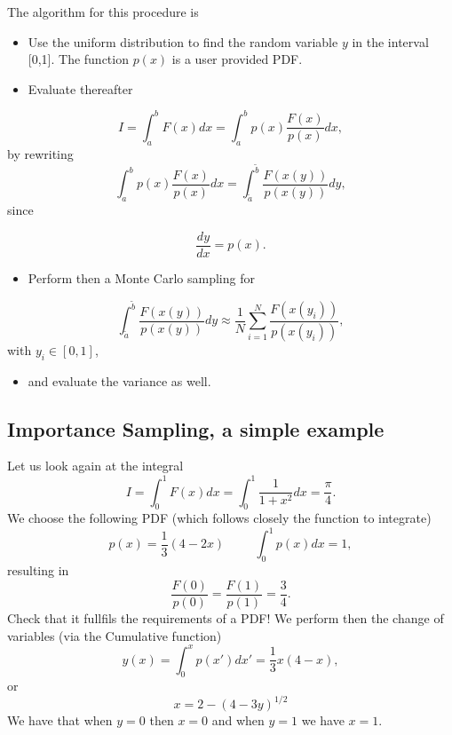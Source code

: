 \documentclass[%
oneside,                 %
final,                   %
10pt]{article}
\newenvironment{block_mdfboxadmon}[1][]{
\begin{block_mdfboxmdframed}[frametitle=#1]
}
{
\end{block_mdfboxmdframed}
}
\begin{document}
\begin{block_mdfboxadmon}[]
The algorithm for this procedure is 

\begin{itemize}
\item Use the uniform distribution to find the random variable   $y$ in the interval [0,1]. The function $p(x)$ is a user provided PDF.

\item Evaluate thereafter   
\end{itemize}

\noindent
\begin{equation*}    
I=\int_a^b F(x) dx =\int_a^b p(x)\frac{F(x)}{p(x)} dx,
\end{equation*}
 by rewriting
\begin{equation*}
   \int_a^b p(x)\frac{F(x)}{p(x)} dx =   
   \int_{\tilde{a}}^{\tilde{b}}\frac{F(x(y))}{p(x(y))} dy,
\end{equation*}
since

\begin{equation*}
   \frac{dy}{dx}=p(x).
\end{equation*}
\begin{itemize}
 \item Perform then a Monte Carlo sampling for  
\end{itemize}

\noindent
\begin{equation*} 
\int_{\tilde{a}}^{\tilde{b}}\frac{F(x(y))}{p(x(y))} dy\approx  \frac{1}{N}\sum_{i=1}^N\frac{F(x(y_i))}{p(x(y_i))},
\end{equation*}
with $y_i\in [0,1]$,
\begin{itemize}
\item and evaluate the variance as well.
\end{itemize}

\noindent
\end{block_mdfboxadmon} %




\subsection{Importance Sampling, a simple example}

\begin{block_mdfboxadmon}[]
Let us look again at the integral
\[
   I=\int_0^1 F(x) dx = \int_0^1 \frac{1}{1+x^2} dx = \frac{\pi}{4}.
\]
We choose the following PDF (which follows closely the function to
integrate)
\[
   p(x)=\frac{1}{3}\left(4-2x\right) \hspace{1cm} \int_0^1p(x)dx=1,
\]
resulting in
\[
   \frac{F(0)}{p(0)}=\frac{F(1)}{p(1)}=\frac{3}{4}.
\]
Check that it fullfils the requirements of a PDF!
We perform then the change of variables (via the Cumulative function) 
\[
     y(x)=\int_0^x p(x')dx'=\frac{1}{3}x\left(4-x\right),
\]
or
\[
   x=2-\left(4-3y\right)^{1/2}
\]
We have that when $y=0$ then  $x=0$ and when  $y=1$ we have $x=1$.
\end{block_mdfboxadmon} %
\end{document}
